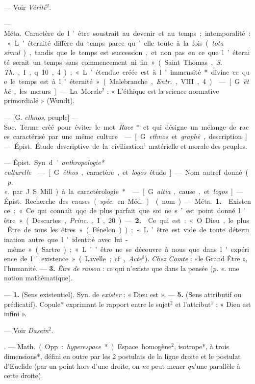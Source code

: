 \begin{itemize}[leftmargin=1cm, label=, itemsep=1pt]
 — Voir {\it Vérité}$^2$.

 — \si{Méta.} Caractère de l'être
soustrait au devenir et au temps ;
intemporalité : « L'éternité diffère
du temps parce qu’elle toute à la
fois ({\it tota simul}), tandis que le temps
est succession, et non pas en ce que
l’éternité serait un temps sans commencement ni fin » (Saint Thomas,
{\it S. Th.}, I, q. 10, 4); « L’étendue créée
est à l’immensité* divine ce que le
temps est à l'éternité » (Malebranche, {\it Entr.}, VIII, 4).

 — [G. {\it êthê}, les mœurs] — La
Morale$^2$ : « L’éthique est la science
normative primordiale » (Wundt).

 — [G. {\it ethnos}, peuple] — \si{Soc.}
Terme créé pour éviter le mot {\it Race}*
et qui désigne un mélange de races
caractérisé par une même culture.

 — [G. {\it ethnos} et {\it graphê},
description] — \si{Épist.} Étude descriptive de la civilisation$^1$ matérielle et morale des peuples.

 — \si{Épist.} Syn. d'{\it anthropologie* culturelle}.

 — [G. {\it êthos}, caractère, et {\it logos}
étude] — Nom autref. donné ({\it p. e.}
par J. S. Mill) à la caractérologie*.

 — [G. {\it aitia}, cause, et {\it logos}] —
\si{Épist.} Recherche des causes ({\it spéc.}
en \si{Méd.}).

 (nom) — \si{Méta.} {\bf 1.}  Existence :
« Ce qui connaît qqc. de plus parfait
que soi ne s’est point donné l'être »
(Descartes, {\it Princ.}, I, 20). — {\bf 2.}  Ce
qui est : « O Dieu, le plus Être de
tous les êtres » (Fénelon)); « L’être
est vide de toute détermination
autre que l'identité avec lui-même »
(Sartre); « L'’être ne se découvre à
nous que dans l'expérience de l’existence »
(Lavelle; cf, {\it Acte}$^3$). {\it Chez
Comte} : «le Grand Être », l'humanité.
— {\bf 3.} {\it Être de raison} : ce qui n'existe
que dans la pensée ({\it p. e.} une notion
mathématique).

 — {\bf 1.} (Sens existentiel).
Syn. de {\it exister} : « Dieu est ». — {\bf 5.}
(Sens attributif ou prédicatif). Copule* exprimant le rapport entre le
sujet$^2$ et l'attribut$^1$ : « Dieu est infini ».

 — Voir {\it Dasein}$^2$.

. — \si{Math.} (Opp. :
{\it hyperespace}*). Espace homogène$^2$,
isotrope*, à trois dimensions*, défini
en outre par les 2 postulats de la
ligne droite et le postulat d'Euclide
(par un point hors d’une droite, on
{\it ne} peut mener {\it qu}'une parallèle à
cette droite).


\end{itemize}
